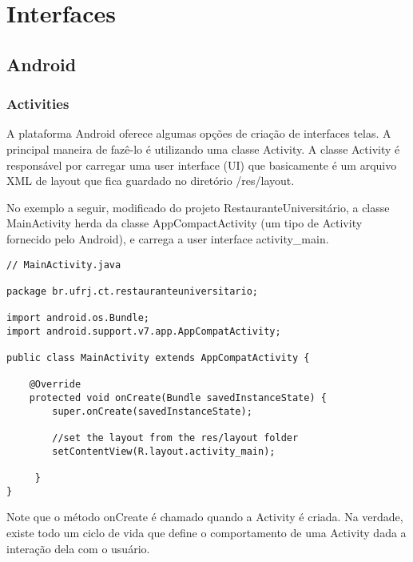 \chapter{Interfaces}

\section{Android}
\subsection{Activities}
A plataforma Android oferece algumas opções de criação de interfaces telas. A principal maneira de 
fazê-lo é utilizando uma classe Activity. A classe Activity é responsável por carregar uma user interface 
(UI) que basicamente é um arquivo XML de layout que fica guardado no diretório /res/layout.

No exemplo a seguir, modificado do projeto RestauranteUniversitário, a classe MainActivity herda da classe
AppCompactActivity (um tipo de Activity fornecido pelo Android), e carrega a user interface activity\_main.


\lstset{language=Java}

\begin{lstlisting}
// MainActivity.java

package br.ufrj.ct.restauranteuniversitario;

import android.os.Bundle;
import android.support.v7.app.AppCompatActivity;

public class MainActivity extends AppCompatActivity {
    
    @Override
    protected void onCreate(Bundle savedInstanceState) {
        super.onCreate(savedInstanceState);

        //set the layout from the res/layout folder
        setContentView(R.layout.activity_main);
        
     }
}

\end{lstlisting}

Note que o método onCreate é chamado quando a Activity é criada. Na verdade, existe 
todo um ciclo de vida que define o comportamento de uma Activity dada a interação dela com o usuário.


